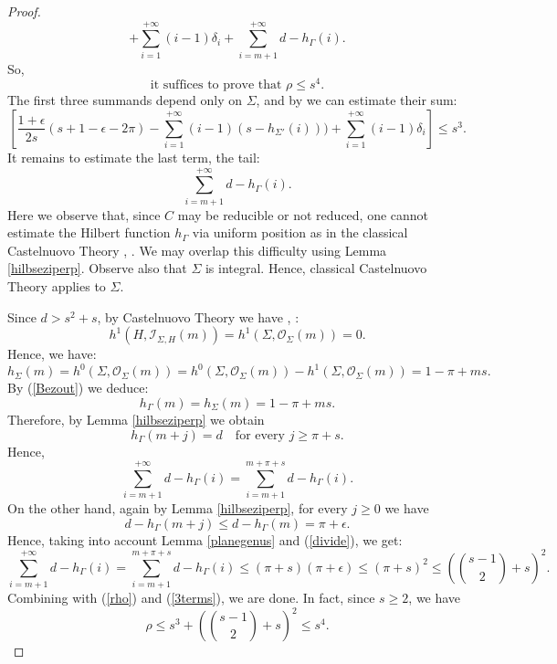\documentclass[9pt,a4paper]{amsart}
\theoremstyle{plain}
\theoremstyle{definition}
\theoremstyle{remark}
\begin{document}
\begin{proof}
$$+\sum_{i=1}^{+\infty}(i-1)\delta_i+\sum_{i=m+1}^{+\infty}d-h_{\Gamma}(i).
$$
So,
\begin{equation}\label{rho}
{\text{it suffices to prove that $\rho\leq s^4$.}}
\end{equation}
The first three summands depend only on $\Sigma$, and by
\cite[Lemma, (2.5), (2.7), (2.8)]{D3} we can estimate their sum:
\begin{equation}\label{3terms}
\left[\frac{1+\epsilon}{2s}(s+1-\epsilon-2\pi)-\sum_{i=1}^{+\infty}(i-1)(s-h_{\Sigma'}(i)))
+\sum_{i=1}^{+\infty}(i-1)\delta_i\right]\leq s^3.
\end{equation}
It remains to estimate the last term, the tail:
$$
\sum_{i=m+1}^{+\infty}d-h_{\Gamma}(i).
$$
Here we observe that, since $C$ may be reducible or not reduced, one
cannot estimate the Hilbert function $h_{\Gamma}$ via uniform
position as in the classical Castelnuovo Theory \cite{EH},
\cite{CCD}. We may overlap this difficulty using Lemma
\ref{hilbseziperp}. Observe also that $\Sigma$ is integral. Hence,
classical Castelnuovo Theory applies to $\Sigma$.

\smallskip
Since $d>s^2+s$, by Castelnuovo Theory we have \cite[Theorem, $(i)$, p. 492]{GLP},
\cite[Theorem (3.7), p. 87]{EH}:
$$
h^1(H,\mathcal I_{\Sigma, H}(m))=h^1(\Sigma,\mathcal
O_{\Sigma}(m))=0.
$$
Hence, we have:
$$
h_{\Sigma}(m)=h^0(\Sigma,\mathcal O_{\Sigma}(m))=h^0(\Sigma,\mathcal
O_{\Sigma}(m))-h^1(\Sigma,\mathcal O_{\Sigma}(m))=1-\pi+ms.
$$
By (\ref{Bezout}) we deduce:
$$
h_{\Gamma}(m)=h_{\Sigma}(m)=1-\pi+ms.
$$
Therefore, by Lemma \ref{hilbseziperp} we obtain
$$
h_{\Gamma}(m+j)=d\quad {\text{for every $j\geq \pi+s$.}}
$$
Hence,
$$
\sum_{i=m+1}^{+\infty}d-h_{\Gamma}(i)=\sum_{i=m+1}^{m+\pi+s}d-h_{\Gamma}(i).
$$
On the other hand, again by Lemma \ref{hilbseziperp}, for every
$j\geq 0$ we have
$$
d-h_{\Gamma}(m+j)\leq d-h_{\Gamma}(m)=\pi+\epsilon.
$$
Hence, taking into account Lemma \ref{planegenus} and
(\ref{divide}), we get:
$$
\sum_{i=m+1}^{+\infty}d-h_{\Gamma}(i)=\sum_{i=m+1}^{m+\pi+s}d-h_{\Gamma}(i)\leq
(\pi+s)(\pi+\epsilon)\leq (\pi+s)^2\leq
\left(\binom{s-1}{2}+s\right)^2.
$$
Combining with (\ref{rho}) and (\ref{3terms}), we are done. In fact,
since $s\geq 2$, we have
$$
\rho \leq  s^3+\left(\binom{s-1}{2}+s\right)^2\leq s^4.
$$
\end{proof}
\end{document}
